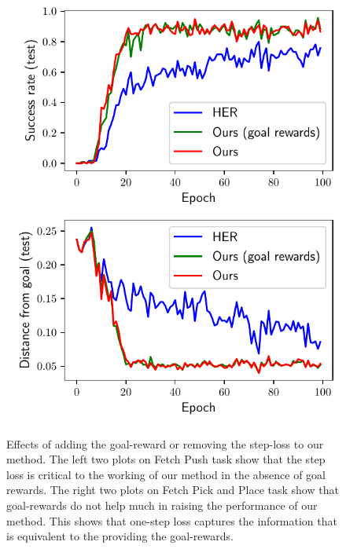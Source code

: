 \begin{figure}
\begin{minipage}[b]{0.5\linewidth}
    \includegraphics[width=\frac\columnwidth]{media/res/ablate-ours-with-goal-reward/FetchPickAndPlace-dqstepoch-test/success_rate.pdf}%
    \includegraphics[width=\frac\columnwidth]{media/res/ablate-ours-with-goal-reward/FetchPickAndPlace-dqstepoch-test/ag_g_dist.pdf}\\
    \label{fig:with-and-without-step-loss-b}
  \end{minipage}
  \caption{
    Effects of adding the goal-reward or removing the step-loss to our method.
    The left two plots on Fetch Push task show that the step loss is critical to the working of our
    method in the absence of goal rewards.
    The right two plots on Fetch Pick and Place task show that goal-rewards do not help much in raising the
    performance of our method. This shows that one-step loss captures the
    information that is equivalent to the providing the goal-rewards.}
  \label{fig:with-and-without-step-loss}%
\end{figure}%
% 

